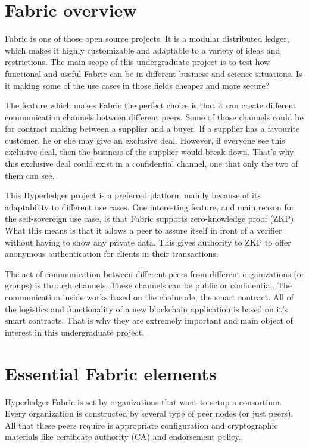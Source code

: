 \documentclass[a4paper,11pt]{report}
\begin{document}
\section{Fabric overview}
	Fabric is one of those open source projects. It is a modular distributed ledger, which makes it highly customizable and adaptable to a variety of ideas and restrictions. The main scope of this undergraduate project is to test how functional and useful Fabric can be in different business and science situations. Is it making some of the use cases in those fields cheaper and more secure?
	
The feature which makes Fabric the perfect choice is that it can create different communication channels between different peers. Some of those channels could be for contract making between a supplier and a buyer. If a supplier has a favourite customer, he or she may give an exclusive deal. However, if everyone see this exclusive deal, then the business of the supplier would break down. That’s why this exclusive deal could exist in a confidential channel, one that only the two of them can see. 

	This Hyperledger project is a preferred platform mainly because of its adaptability to different use cases. One interesting feature, and main reason for the self-sovereign use case, is that Fabric supports zero-knowledge proof (ZKP). What this means is that it allows a peer to assure itself in front of a verifier without having to show any private data. This gives authority to ZKP to offer anonymous authentication for clients in their transactions. \cite{li2018fppb}
	
	The act of communication between different peers from different organizations (or groups) is through channels. These channels can be public or confidential. The communication inside works based on the chaincode, the smart contract. All of the logistics and functionality of a new blockchain application is based on it’s smart contracts. That is why they are extremely important and main object of interest in this undergraduate project.
	
	
\section{Essential Fabric elements}
\label{felements}
Hyperledger Fabric is set by organizations that want to setup a consortium. Every organization is constructed by several type of peer nodes (or just peers). All that these peers require is appropriate configuration and cryptographic materials like certificate authority (CA) and endorsement policy.
\end{document}
